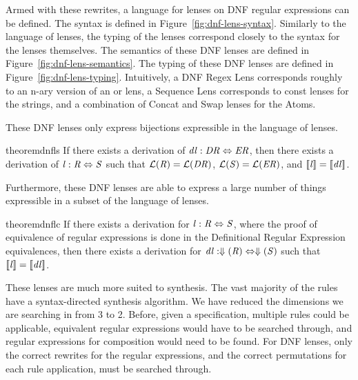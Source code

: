 \documentclass[numbers]{sigplanconf}
\begin{document}
Armed with these rewrites, a language for lenses on DNF regular
expressions can be defined.
The syntax is defined in Figure~\ref{fig:dnf-lens-syntax}.
Similarly to the language of lenses, the typing of the lenses
correspond closely to the syntax for the lenses themselves.
The semantics of these DNF lenses are defined in
Figure~\ref{fig:dnf-lens-semantics}.
The typing of these DNF lenses are defined in Figure~\ref{fig:dnf-lens-typing}.
Intuitively, a DNF Regex Lens corresponds roughly to an n-ary version of an or lens,
a Sequence Lens corresponds to const lenses for the strings, and a combination of
Concat and Swap lenses for the Atoms.

These DNF lenses only express bijections expressible in the language of lenses.
\begin{restatable}{theorem}{dnfls}
  \label{thm:dnfls}
  If there exists a derivation of $\mathit{dl} : \mathit{DR} \Leftrightarrow \mathit{ER}$,
  then there exists a derivation of $\mathit{l} : \mathit{R} \Leftrightarrow \mathit{S}$ such that
  $\mathcal{L}(\mathit{R})=\mathcal{L}(\mathit{DR})$,
  $\mathcal{L}(\mathit{S})=\mathcal{L}(\mathit{ER})$, and
  $[ \! [\mathit{l}] \! ]=[ \! [\mathit{dl}] \! ]$.
\end{restatable}

Furthermore, these DNF lenses are able to express a large number of things
expressible in a subset of the language of lenses.
\begin{restatable}{theorem}{dnflc}
  \label{thm:dnflc}
  If there exists a derivation for $\mathit{l} : \mathit{R} \Leftrightarrow
  \mathit{S}$,
  where the proof of equivalence of regular expressions is done in the
  Definitional Regular Expression equivalences,
  then there exists a derivation for
  $\mathit{dl} : \Downarrow(\mathit{R}) \Leftrightarrow \Downarrow(\mathit{S})$
  such that $[ \! [\mathit{l}] \! ]=[ \! [\mathit{dl}] \! ]$.
\end{restatable}


These lenses are much more suited to synthesis.
The vast majority of the rules have a syntax-directed synthesis algorithm.
We have reduced the dimensions we are searching in from 3 to 2.  Before, given a
specification, multiple rules could be applicable, equivalent regular
expressions would have to be searched through, and regular expressions for
composition would need to be found.
For DNF lenses, only the correct rewrites for the regular expressions, and the
correct permutations for each rule application, must be searched through.
\end{document}
